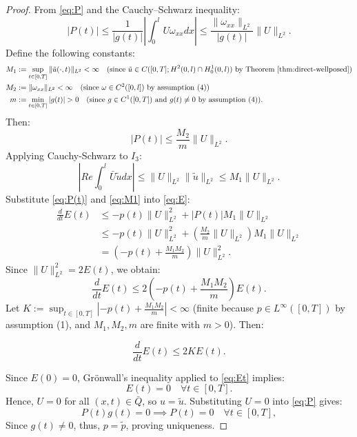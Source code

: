 \documentclass[reqno]{amsart}
\begin{document}
\begin{proof}
From \eqref{eq:P} and the Cauchy–Schwarz inequality:
\[
|P(t)| \leq \frac{1}{|g(t)|} \left| \int_0^l U \omega_{xx}  dx \right| \leq \frac{ \| \omega_{xx} \|_{L^2} }{ |g(t)| } \| U \|_{L^2}.
\]
Define the following constants:
\begin{align*}
M_1 &:= \sup_{t \in [0,T]} \| \tilde{u}(\cdot,t) \|_{L^2} < \infty \quad 
\text{(since $\tilde{u} \in C([0,T];H^2(0,l) \cap H_0^1(0,l))$ by Theorem \ref{thm:direct-wellposed})} \\
M_2 &:= \| \omega_{xx} \|_{L^2} < \infty \quad 
\text{(since $\omega \in C^2([0,l])$ by assumption (4))} \\
m &:= \min_{t \in [0,T]} |g(t)| > 0 \quad 
\text{(since $g \in C^1([0,T])$ and $g(t) \neq 0$ by assumption (4))}.
\end{align*}
Then:
\begin{equation}\label{eq:P(t)}
|P(t)| \leq \frac{M_2}{m}\|U\|_{L^2}.  
\end{equation}
Applying Cauchy-Schwarz to $I_3$:
\begin{equation}\label{eq:M1}
\left| Re\int_0^l \bar{U} \tilde{u}  dx \right| \leq \|U\|_{L^2} \|\tilde{u}\|_{L^2} \leq M_1 \|U\|_{L^2}.
\end{equation}
Substitute \eqref{eq:P(t)} and \eqref{eq:M1} into \eqref{eq:E}:
\begin{align*}
\frac{d}{dt}E(t) &\leq -p(t) \|U\|_{L^2}^2 + |P(t)| M_1 \|U\|_{L^2} \\
&\leq -p(t) \|U\|_{L^2}^2 + \left( \frac{M_2}{m} \|U\|_{L^2} \right) M_1 \|U\|_{L^2} \\
&= \left( -p(t) + \frac{M_1 M_2}{m} \right) \|U\|_{L^2}^2.
\end{align*}
Since $\|U\|_{L^2}^2=2E(t)$, we obtain:
\[
\frac{d}{dt}E(t) \leq 2 \left( -p(t) + \frac{M_1 M_2}{m} \right) E(t).
\]
Let $K := \sup_{t \in [0,T]} \left| -p(t) + \frac{M_1 M_2}{m} \right| < \infty$ (finite because $p \in L^{\infty}([0,T])$ by assumption (1), and $M_1, M_2, m$ are finite with $m > 0$). Then:

\begin{equation} \label{eq:Et}
  \frac{d}{dt}E(t) \leq 2K E(t).  
\end{equation}

Since $E(0) = 0$, Grönwall's inequality applied to \eqref{eq:Et} implies:
\[
E(t) = 0 \quad  \forall t \in [0, T].
\]
Hence, $U = 0$ for all $(x,t) \in \bar{Q}$, so $u=\tilde{u}$.
Substituting $U=0$ into \eqref{eq:P} gives:
\[
P(t)g(t) = 0 \implies P(t) = 0 \quad \forall t \in [0,T],
\]
Since $g(t) \neq 0$, thus, $p = \tilde{p}$, proving uniqueness.
\end{proof}
\end{document}
